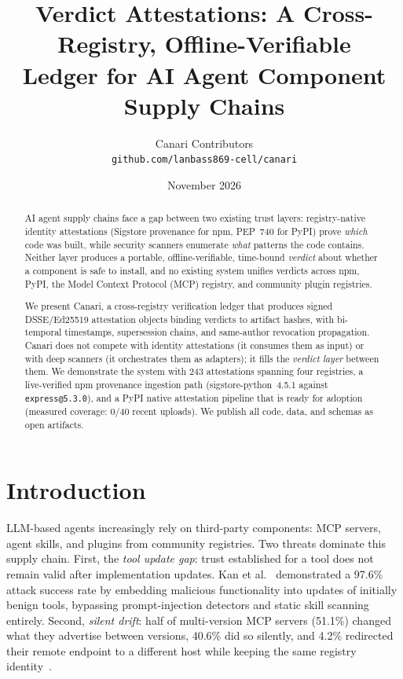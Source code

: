 \documentclass[11pt,a4paper]{article}
\title{Verdict Attestations: A Cross-Registry, Offline-Verifiable\\Ledger for AI Agent Component Supply Chains}
\author{Canari Contributors\\ \small \texttt{github.com/lanbass869-cell/canari}}
\date{November 2026}
\begin{document}
\maketitle

\begin{abstract}
AI agent supply chains face a gap between two existing trust layers: registry-native
identity attestations (Sigstore provenance for npm, PEP~740 for PyPI) prove
\emph{which} code was built, while security scanners enumerate \emph{what} patterns
the code contains. Neither layer produces a portable, offline-verifiable,
time-bound \emph{verdict} about whether a component is safe to install, and no
existing system unifies verdicts across npm, PyPI, the Model Context Protocol (MCP)
registry, and community plugin registries.

We present Canari, a cross-registry verification ledger that produces signed
DSSE/Ed25519 attestation objects binding verdicts to artifact hashes, with
bi-temporal timestamps, supersession chains, and same-author revocation propagation.
Canari does not compete with identity attestations (it consumes them as input) or
with deep scanners (it orchestrates them as adapters); it fills the \emph{verdict
layer} between them. We demonstrate the system with 243 attestations spanning
four registries, a live-verified npm provenance ingestion path
(sigstore-python~4.5.1 against \texttt{express@5.3.0}), and a PyPI native
attestation pipeline that is ready for adoption (measured coverage: 0/40 recent
uploads). We publish all code, data, and schemas as open artifacts.
\end{abstract}

\section{Introduction}

LLM-based agents increasingly rely on third-party components: MCP servers,
agent skills, and plugins from community registries. Two threats dominate this
supply chain. First, the \emph{tool update gap}: trust established for a tool
does not remain valid after implementation updates. Kan et al.~\cite{etude}
demonstrated a 97.6\% attack success rate by embedding malicious functionality
into updates of initially benign tools, bypassing prompt-injection detectors
and static skill scanning entirely. Second, \emph{silent drift}: half of
multi-version MCP servers (51.1\%) changed what they advertise between versions,
40.6\% did so silently, and 4.2\% redirected their remote endpoint to a
different host while keeping the same registry identity~\cite{samename}.
\end{document}
